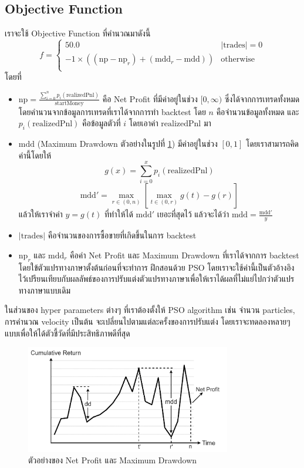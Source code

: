 \subsection{Objective Function}
เราจะใช้ Objective Function ที่คำนวณมาดังนี้
$$ f =
    \begin{cases}
        50.0                                                                & |\text{trades}| = 0 \\
        -1 \times ((\text{np} - \text{np}_r) + (\text{mdd}_r - \text{mdd})) & \text{otherwise}    \\
    \end{cases}
$$
โดยที่
\begin{itemize}
    \item {$\text{np} = \frac{\sum_{i=0}^{n} p_i(\text{realizedPnl})}{\text{startMoney}}$
          คือ Net Profit ที่มีค่าอยู่ในช่วง $[0, \infty)$ ซึ่งได้จากการเทรดทั้งหมดโดยคำนวนจากข้อมูลการเทรดที่เราได้จากการทำ backtest โดย $n$ คือจำนวนข้อมูลทั้งหมด
          และ $p_i(\text{realizedPnl})$ คือข้อมูลตัวที่ $i$ โดยเอาค่า $\text{realizedPnl}$ มา
          }
    \item {$\text{mdd}$ (Maximum Drawdown ตัวอย่างในรูปที่ \ref{fig:10}) มีค่าอยู่ในช่วง $[0, 1]$ โดยเราสามารถคิดค่านี้โดยให้
          $$
              g(x) = \sum_{i = 0}^{x}p_i(\text{realizedPnl})
          $$
          \begin{equation}
              \text{mdd}' = \max_{r \in (0, n)} \left[ \max_{t \in (0, r)} g(t) - g(r) \right]
          \end{equation}
          แล้วให้เราจำค่า $y = g(t)$ ที่ทำให้ได้
          $\text{mdd}'$ เยอะที่สุดไว้ แล้วจะได้ว่า $\text{mdd} = \frac{\text{mdd}'}{y}$
          }
    \item {$|\text{trades}|$ คือจำนวนของการซื้อขายที่เกิดขึ้นในการ backtest}
    \item {$\text{np}_r$ และ  $\text{mdd}_r$ คือค่า Net Profit และ Maximum Drawdown ที่เราได้จากการ backtest โดยใข้ตัวแปรทางภาษาตั้งต้นก่อนที่จะทำการ
          ฝึกสอนด้วย PSO โดยเราจะใช้ค่านี้เป็นตัวอ้างอิงไว้เปรียนเทียบกับผลลัพธ์ของการปรับแต่งตัวแปรทางภาษาเพื่อให้เราได้ผลที่ไม่แย่ไปกว่าตัวแปรทางภาษาแบบเดิม
          }
\end{itemize}
ในส่วนของ hyper parameters ต่างๆ ที่เราต้องตั้งให้ PSO algorithm เช่น จำนวน particles, การคำนวณ velocity เป็นต้น จะเปลี่ยนไปตามแต่ละครั้งของการปรับแต่ง
โดยเราจะทดลองหลายๆ แบบเพื่อให้ได้ตัวชี้วัดที่มีประสิทธิภาพดีที่สุด

\begin{figure}[ht]
    \centering
    \includegraphics[width=0.8\textwidth]{images/mdd.png}
    \caption{ตัวอย่างของ Net Profit และ Maximum Drawdown}
    \label{fig:10}
\end{figure}

